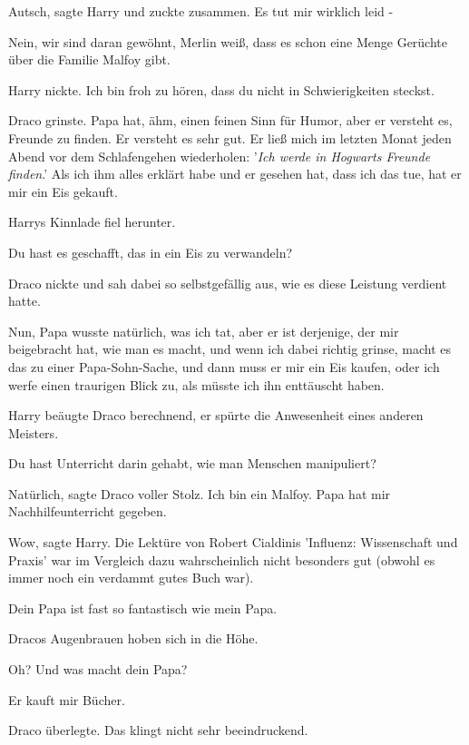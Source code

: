 \glqq{}Autsch\grqq{}, sagte Harry und zuckte zusammen. \glqq{}Es tut mir
wirklich leid -\grqq{}

\glqq{}Nein, wir sind daran gewöhnt, Merlin weiß, dass es schon eine Menge
Gerüchte über die Familie Malfoy gibt.\grqq{}

Harry nickte. \glqq{}Ich bin froh zu hören, dass du nicht in Schwierigkeiten
steckst.\grqq{}

Draco grinste. \glqq{}Papa hat, ähm, einen feinen Sinn für Humor, aber er
versteht es, Freunde zu finden. Er versteht es sehr gut. Er ließ mich im letzten
Monat jeden Abend vor dem Schlafengehen wiederholen: '\emph{Ich werde in
Hogwarts Freunde finden}.' Als ich ihm alles erklärt habe und er gesehen hat,
dass ich das tue, hat er mir ein Eis gekauft.\grqq{}

Harrys Kinnlade fiel herunter.

\glqq{}Du hast es geschafft, das in ein Eis zu verwandeln?\grqq{}

Draco nickte und sah dabei so selbstgefällig aus, wie es diese Leistung verdient
hatte.

\glqq{}Nun, Papa wusste natürlich, was ich tat, aber er ist derjenige, der mir
beigebracht hat, wie man es macht, und wenn ich dabei richtig grinse, macht es
das zu einer Papa-Sohn-Sache, und dann muss er mir ein Eis kaufen, oder ich
werfe einen traurigen Blick zu, als müsste ich ihn enttäuscht haben.\grqq{}

Harry beäugte Draco berechnend, er spürte die Anwesenheit eines anderen
Meisters.

\glqq{}Du hast Unterricht darin gehabt, wie man Menschen manipuliert?\grqq{}

\glqq{}Natürlich\grqq{}, sagte Draco voller Stolz. \glqq{}Ich bin ein Malfoy.
Papa hat mir Nachhilfeunterricht gegeben.\grqq{}

\glqq{}Wow\grqq{}, sagte Harry. Die Lektüre von Robert Cialdinis 'Influenz:
Wissenschaft und Praxis' war im Vergleich dazu wahrscheinlich nicht besonders
gut (obwohl es immer noch ein verdammt gutes Buch war).

\glqq{}Dein Papa ist fast so fantastisch wie mein Papa.\grqq{}

Dracos Augenbrauen hoben sich in die Höhe.

\glqq{}Oh? Und was macht dein Papa?\grqq{}

\glqq{}Er kauft mir Bücher.\grqq{}

Draco überlegte. \glqq{}Das klingt nicht sehr beeindruckend.\grqq{}

